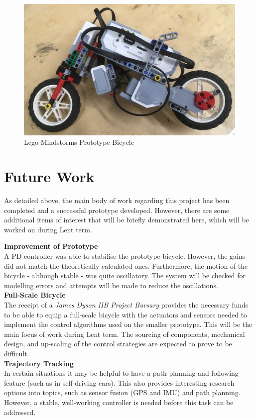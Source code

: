 \documentclass[12pt]{article}
\begin{document}
\begin{figure}[H]
\centering
\includegraphics[scale=0.06]{LegoBike}
\caption{Lego Mindstorms Prototype Bicycle}
\end{figure}


\section{Future Work}
As detailed above, the main body of work regarding this project has been completed and a successful prototype developed. However, there are some additional items of interest that will be briefly demonstrated here, which will be worked on during Lent term.

\noindent \textbf{Improvement of Prototype} \\
A PD controller was able to stabilise the prototype bicycle. However, the gains did not match the theoretically calculated ones. Furthermore, the motion of the bicycle - although stable - was quite oscillatory. The system will be checked for modelling errors and attempts will be made to reduce the oscillations. \\

\noindent \textbf{Full-Scale Bicycle} \\
The receipt of a \textit{James Dyson IIB Project Bursary} provides the necessary funds to be able to equip a full-scale bicycle with the actuators and sensors needed to implement the control algorithms used on the smaller prototype. This will be the main focus of work during Lent term. The sourcing of components, mechanical design, and up-scaling of the control strategies are expected to prove to be difficult. \\

\noindent \textbf{Trajectory Tracking} \\
In certain situations it may be helpful to have a path-planning and following feature (such as in self-driving cars). This also provides interesting research options into topics, such as sensor fusion (GPS and IMU) and path planning. However, a stable, well-working controller is needed before this task can be addressed. 
\end{document}

